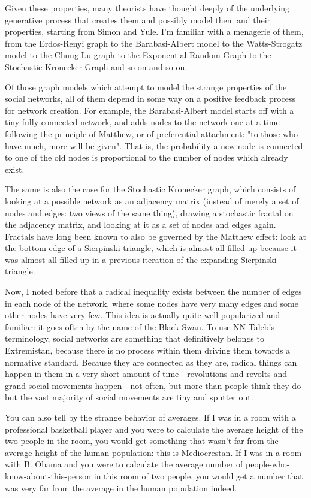 \documentclass[12pt]{article}
\begin{document}
Given these properties, many theorists have thought deeply of the underlying generative process that creates them and possibly model them and their properties, starting from Simon and Yule. I'm familiar with a menagerie of them, from the Erdos-Renyi graph to the Barabasi-Albert model to the Watts-Strogatz model to the Chung-Lu graph to the Exponential Random Graph to the Stochastic Kronecker Graph and so on and so on.

Of those graph models which attempt to model the strange properties of the social networks, all of them depend in some way on a positive feedback process for network creation. For example, the Barabasi-Albert model starts off with a tiny fully connected network, and adds nodes to the network one at a time following the principle of Matthew, or of preferential attachment: "to those who have much, more will be given". That is, the probability a new node is connected to one of the old nodes is proportional to the number of nodes which already exist. 

The same is also the case for the Stochastic Kronecker graph, which consists of looking at a possible network as an adjacency matrix (instead of merely a set of nodes and edges: two views of the same thing), drawing a stochastic fractal on the adjacency matrix, and looking at it as a set of nodes and edges again. Fractals have long been known to also be governed by the Matthew effect: look at the bottom edge of a Sierpinski triangle, which is almost all filled up because it was almost all filled up in a previous iteration of the expanding Sierpinski triangle.

Now, I noted before that a radical inequality exists between the number of edges in each node of the network, where some nodes have very many edges and some other nodes have very few. This idea is actually quite well-popularized and familiar: it goes often by the name of the Black Swan. To use NN Taleb's terminology, social networks are something that definitively belongs to Extremistan, because there is no process within them driving them towards a normative standard. Because they are connected as they are, radical things can happen in them in a very short amount of time - revolutions and revolts and grand social movements happen - not often, but more than people think they do - but the vast majority of social movements are tiny and sputter out.

You can also tell by the strange behavior of averages. If I was in a room with a professional basketball player and you were to calculate the average height of the two people in the room, you would get something that wasn't far from the average height of the human population: this is Mediocrestan. If I was in a room with B. Obama and you were to calculate the average number of people-who-know-about-this-person in this room of two people, you would get a number that was very far from the average in the human population indeed.
\end{document}
